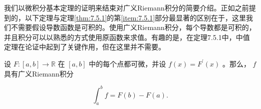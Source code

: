我们以微积分基本定理的证明来结束对广义Riemann积分的简要介绍。正如之前提到的，以下定理与定理\ref{thm:7.5.1}的第\ref{item:7.5.1}部分最显著的区别在于，这里我们不需要假设导数函数是可积的。使用广义Riemann积分，每个导数都是可积的，并且积分可以以熟悉的方式使用原函数来求值。有趣的是，在定理7.5.1中，中值定理在论证中起到了关键作用，但在这里并不需要。

\begin{Thm}
  \label{thm:8.1.9}
  设 \(F : \left\lbrack  {a,b}\right\rbrack   \rightarrow  \mathbb{R}\) 在 \(\left\lbrack  {a,b}\right\rbrack\) 中的每个点都可微，并设 \(f\left( x\right)  = {F}^{\prime }\left( x\right)\) 。那么， \(f\) 具有广义Riemann积分

\[
{\int }_{a}^{b}f = F\left( b\right)  - F\left( a\right) .
\]
\end{Thm}


